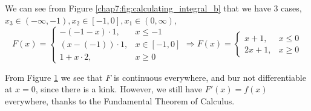 {{\begin{figure}[H]
{
    \label{chap7:fig:Fx_final_b}
  }
  \caption{}
\end{figure}

We can see from Figure 
\ref{chap7:fig:calculating_integral_b}
that we have 3 cases, $x_3 \in (-\infty, -1), x_2 \in [-1, 0], x_1 \in (0, \infty)$,
\begin{equation*}
  F(x) = \begin{cases}
    -(-1-x) \cdot 1, &x \leq -1\\
    (x-(-1)) \cdot 1, &x \in [-1, 0]\\
    1 + x \cdot 2, &x \geq 0
  \end{cases} \Rightarrow
  F(x) = \begin{cases}
    x+1, &x \leq 0\\
    2x+1, &x \geq 0
  \end{cases}
\end{equation*}

From Figure 
\ref{chap7:fig:Fx_final_b}
we see that 
$F$ is continuous everywhere, and bur not differentiable at $x=0$,
since there is a kink.
However, we still have $F'(x) = f(x)$ everywhere,
thanks to the Fundamental Theorem of Calculus.
}
}


